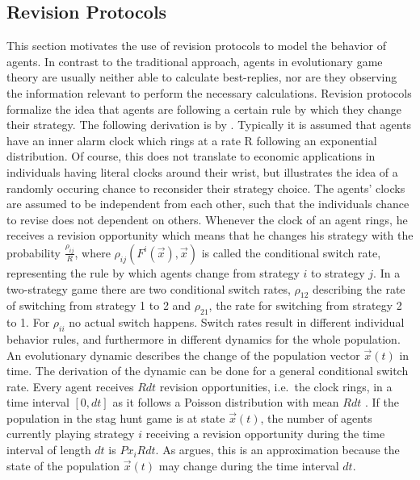\subsection{Revision Protocols}
\label{sec:revisionprotocols}
This section motivates the use of revision protocols to
model the behavior of agents.
In contrast to the traditional approach, agents in evolutionary game theory 
are usually neither able to calculate best-replies, 
nor are they observing the information relevant
to perform the necessary calculations.
Revision protocols formalize the idea that agents are following a certain
rule by which they change their strategy. 
The following derivation is by \textcite{sandholm_population_2010}. 
Typically it is assumed that agents have an inner alarm clock 
which rings at a rate R following an exponential distribution. 
Of course, this does not translate 
to economic applications in individuals having literal clocks around their
wrist, but illustrates the idea of a randomly occuring chance to reconsider
their strategy choice.
The agents' clocks are assumed to be independent from each other, such that
the individuals chance to revise does not dependent on others.
Whenever the clock of an agent rings, he
receives a revision opportunity which means that he changes his strategy
with the probability $\frac{\rho_{ij}}{R}$, where
$\rho_{ij}(F^i(\vec{x}),\vec{x})$ is called the conditional switch rate,
representing the rule by which agents change from strategy 
$i$ to strategy $j$. 
In a two-strategy game there are two conditional switch rates, $\rho_{12}$ 
describing the rate of switching from strategy 1 to 2 and $\rho_{21}$, 
the rate for switching from strategy 2 to 1. For $\rho_{ii}$ no actual switch 
happens.
Switch rates result in different individual behavior rules, and furthermore 
in different dynamics for the whole population. An evolutionary
dynamic describes the change of the population vector $\vec{x}(t)$ in time. 
The derivation of the dynamic can be done for a general conditional switch 
rate. 
Every agent receives $R dt$ revision opportunities, i.e.\ the clock rings, 
in a time interval $[0,dt]$ as it follows a Poisson distribution with
mean $Rdt$ \parencite[123]{sandholm_population_2010}. 
If the population in the stag hunt game is at state $\vec{x}(t)$, the number 
of agents currently playing strategy $i$ receiving a revision opportunity 
during the time interval of length $dt$ is $Px_i R dt$. As 
\textcite{sandholm_population_2010} argues, this is an approximation because
the state of the population $\vec{x}(t)$ may change during the time interval $dt$.
